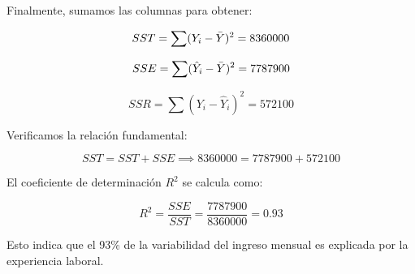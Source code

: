 \documentclass[10pt,a4paper]{article}
\begin{document}
Finalmente, sumamos las columnas para obtener:

$$SST = \sum (Y_i - \Bar{Y})^2=8360000$$

$$SSE = \sum (\hat{Y}_i - \Bar{Y})^2= 7787900$$

$$SSR = \sum (Y_i - \hat{Y}_i)^2 = 572100$$

Verificamos la relación fundamental:

$$SST = SST+SSE \implies 8360000=7787900+572100$$

El coeficiente de determinación $R^2$ se calcula como:

$$R^2 = \frac{SSE}{SST} = \frac{7787900}{8360000} = 0.93$$


Esto indica que el 93\% de la variabilidad del ingreso mensual es explicada por la experiencia laboral.
\end{document}
